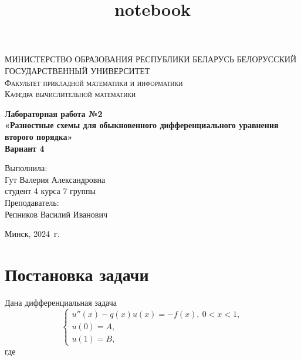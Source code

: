 \documentclass[a4paper, 12pt]{article}
\title{notebook}
\begin{document}
    
    \begin{titlepage}
    	\begin{center}
    		\textsc{МИНИСТЕРСТВО ОБРАЗОВАНИЯ РЕСПУБЛИКИ БЕЛАРУСЬ БЕЛОРУССКИЙ ГОСУДАРСТВЕННЫЙ УНИВЕРСИТЕТ
    			\\[5mm]
    			Факультет прикладной математики и информатики\\[2mm]
    			Кафедра вычислительной математики
    		}
    		
    		\vfill
    		
    		\textbf{Лабораторная работа №2
    			\\[3mm]
    			«Разностные схемы для обыкновенного дифференциального уравнения второго порядка»\\[6mm]
    			Вариант 4
    			\\[20mm]
    		}
    	\end{center}
    	
    	\hfill
    	\begin{minipage}{.4\textwidth}
    		Выполнила:\\[2mm] 
    		Гут Валерия Александровна\\
    		студент 4 курса 7 группы\\[5mm]
    		
    		Преподаватель:\\[2mm] 
    		Репников Василий Иванович
    	\end{minipage}%
    	\vfill
    	\begin{center}
    		Минск, 2024\ г.
    	\end{center}
    \end{titlepage}
    
    

    
    \hypertarget{ux43fux43eux441ux442ux430ux43dux43eux432ux43aux430-ux437ux430ux434ux430ux447ux438}{%
\section*{Постановка
задачи}\label{ux43fux43eux441ux442ux430ux43dux43eux432ux43aux430-ux437ux430ux434ux430ux447ux438}}

    Дана дифференциальная задача \begin{equation}
    \begin{cases}
        u''(x) - q(x)u(x) = -f(x),\ 0 < x<1,\\
        u(0) = A,\\
        u(1) = B,
    \end{cases}
\end{equation} где
\end{document}
